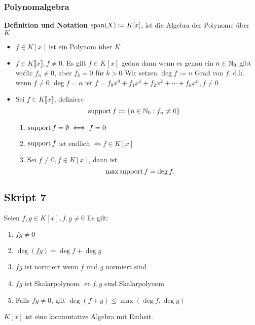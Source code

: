 \subsubsection{Polynomalgebra}
\textbf{Definition und Notation}
$ \operatorname{span}(X) \coloneqq K[x] $, ist die Algebra der Polynome über $ K $ 
\begin{itemize}
	\item $ f \in K[x] $ ist ein Polynom über $ K $ 
	\item $ f \in K\llbracket x \rrbracket, f \neq 0 $. Es gilt $ f \in K[x] $ gedau dann wenn es genau ein $ n \in \mathbb{N} _0 $ gibt wofür $ f_n \neq 0 $, aber $ f_k = 0 $ für $ k > 0 $
		Wir setzen
		$ \deg f := n $ Grad von $ f $. d.h. wenn $ f \neq 0 $ $ \deg f = n $ ist $ f = f_0 x^0 + f_1 x^1 + f_2 x^2 + \dotsb + f_n x^n, f \neq 0 $
	\item Sei $ f \in K \llbracket x \rrbracket $, definiere
		\[
			\operatorname{support} f \coloneqq \left\{ n \in \mathbb{N} _0 : f_n \neq 0 \right\} 
		\]
		\begin{enumerate}[label=(\roman*)]
			\item $ \operatorname{support} f = \emptyset \iff  f = 0 $ 
			\item $ \operatorname{support} f $ ist endlich $ \iff f \in K[x] $ 
			\item Sei $ f \neq 0, f \in K[x] $, dann ist 
				\[
					\max \operatorname{support} f = \deg f.
				\]
		\end{enumerate}
\end{itemize}

\subsection{Skript 7}
\begin{subtheorem}
	Seien $ f, g \in K[x], f, g \neq 0 $ Es gilt:
	\begin{enumerate}[label=(\roman*)]
		\item $ f g \neq 0 $
		\item $ \deg (fg) = \deg f + \deg g $ 
		\item $ f g $ ist normiert wenn $ f $ und $ g $ normiert sind
		\item $ f g  $ ist Skalarpolynom $ \iff f, g  $ sind Skalarpolynom
		\item Falls $ f  g \neq 0 $, gilt $ \deg (f + g) \leq \max( \deg f, \deg g)  $
	\end{enumerate}
\end{subtheorem}

\begin{subcorollary}
	$ K[x] $ ist eine kommutative Algebra mit Einheit.
\end{subcorollary}

